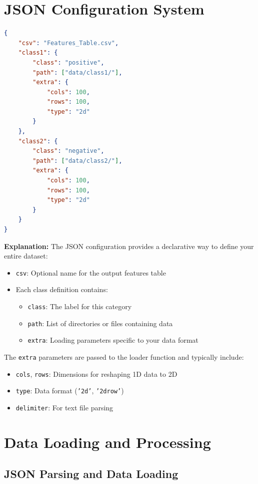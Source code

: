 \documentclass[10pt]{book}
\begin{document}
\section{JSON Configuration System}

\begin{lstlisting}[language=JSON]
{
    "csv": "Features_Table.csv",
    "class1": {
        "class": "positive",
        "path": ["data/class1/"],
        "extra": {
            "cols": 100, 
            "rows": 100, 
            "type": "2d"
        }
    },
    "class2": {
        "class": "negative", 
        "path": ["data/class2/"],
        "extra": {
            "cols": 100, 
            "rows": 100, 
            "type": "2d"
        }
    }
}
\end{lstlisting}

\textbf{Explanation:}
The JSON configuration provides a declarative way to define your entire dataset:
\begin{itemize}
\item \texttt{csv}: Optional name for the output features table
\item Each class definition contains:
  \begin{itemize}
  \item \texttt{class}: The label for this category
  \item \texttt{path}: List of directories or files containing data
  \item \texttt{extra}: Loading parameters specific to your data format
  \end{itemize}
\end{itemize}

The \texttt{extra} parameters are passed to the loader function and typically include:
\begin{itemize}
\item \texttt{cols}, \texttt{rows}: Dimensions for reshaping 1D data to 2D
\item \texttt{type}: Data format (\texttt{'2d'}, \texttt{'2drow'})
\item \texttt{delimiter}: For text file parsing
\end{itemize}

\section{Data Loading and Processing}

\subsection{JSON Parsing and Data Loading}
\end{document}
